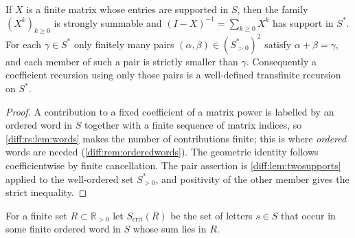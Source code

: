 \documentclass[11pt,letterpaper]{article}
\numberwithin{equation}{section}
\theoremstyle{definition}
\theoremstyle{remark}
\newcommand{\R}{\mathbb R}
\newcommand{\crit}{\mathrm{crit}}
\begin{document}
\begin{corollary}
\label{diff:rs:cor:support}
If $X$ is a finite matrix whose entries are supported in $S$, then the family
$(X^{k})_{k\geq0}$ is strongly summable and $(I-X)^{-1}=\sum_{k\geq0}X^{k}$ has
support in $S^{*}$. For each $\gamma\in S^{*}$ only finitely many pairs
$(\alpha,\beta)\in(S^{*}_{>0})^{2}$ satisfy $\alpha+\beta=\gamma$, and each
member of such a pair is strictly smaller than $\gamma$. Consequently a
coefficient recursion using only those pairs is a well-defined transfinite
recursion on $S^{*}$.
\end{corollary}
\begin{proof}
A contribution to a fixed coefficient of a matrix power is labelled by an
ordered word in $S$ together with a finite sequence of matrix indices, so
\cref{diff:rs:lem:words} makes the number of contributions finite; this is
where \emph{ordered} words are needed (\cref{diff:rem:orderedwords}). The
geometric identity follows coefficientwise by finite cancellation. The pair
assertion is \cref{diff:lem:twosupports} applied to the well-ordered set
$S^{*}_{>0}$, and positivity of the other member gives the strict inequality.
\end{proof}

\begin{definition}
\label{diff:rs:def:critical}
For a finite set $R\subset\R_{>0}$ let $S_{\crit}(R)$ be the set of letters
$s\in S$ that occur in some finite ordered word in $S$ whose sum lies in $R$.
\end{definition}
\end{document}
